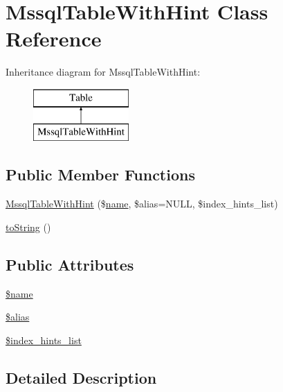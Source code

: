 \hypertarget{classMssqlTableWithHint}{}\section{Mssql\+Table\+With\+Hint Class Reference}
\label{classMssqlTableWithHint}
Inheritance diagram for Mssql\+Table\+With\+Hint\+:\begin{figure}[H]
\begin{center}
\leavevmode
\includegraphics[height=2.000000cm]{classMssqlTableWithHint}
\end{center}
\end{figure}
\subsection*{Public Member Functions}
\begin{DoxyCompactItemize}
\item 
\hyperlink{classMssqlTableWithHint_a7d6526d0b856c8a5afe4b630b27ddbe4}{Mssql\+Table\+With\+Hint} (\$\hyperlink{common_8js_a22c29d2aa8ed6161ce8faa718ef76e68}{name}, \$alias=N\+U\+LL, \$index\+\_\+hints\+\_\+list)
\item 
\hyperlink{classMssqlTableWithHint_ac73aaae941e5dd3f4c22d7c718a317f8}{to\+String} ()
\end{DoxyCompactItemize}
\subsection*{Public Attributes}
\begin{DoxyCompactItemize}
\item 
\hyperlink{classMssqlTableWithHint_a277ff00978ac421ee07783d796318bf5}{\$name}
\item 
\hyperlink{classMssqlTableWithHint_abe5643a9f48a397be1d66f7aba2fd7d9}{\$alias}
\item 
\hyperlink{classMssqlTableWithHint_af748588ba4420eb31c412a83b1623a60}{\$index\+\_\+hints\+\_\+list}
\end{DoxyCompactItemize}


\subsection{Detailed Description}


